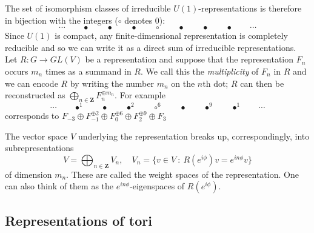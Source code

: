 \documentclass[12pt]{article}
\newcommand{\ZZ}{\mathbf{Z}}
\theoremstyle{definition}
\theoremstyle{check}
\theoremstyle{remark}
\theoremstyle{TheoremNum}
\begin{document}
The set of isomorphism classes of irreducible $U(1)$-representations is therefore in bijection with the integers ($\circ$ denotes 0):
\[
\cdots\qquad\bullet\qquad\bullet\qquad\bullet\qquad\circ\qquad\bullet\qquad\bullet\qquad\bullet\qquad\cdots
\]
Since $U(1)$ is compact, any finite-dimensional representation is completely reducible and so we can write it as a direct sum of irreducible representations. Let $R\colon G\to GL(V)$ be a representation and suppose that the representation $F_n$ occurs $m_n$ times as a summand in $R$. We call this the {\em multiplicity} of $F_n$ in $R$ and we can encode $R$ by writing the number $m_n$ on the $n$th dot; $R$ can then be reconstructed as $\bigoplus_{n\in\ZZ}F_n^{\oplus m_n}$. For example
\[
\cdots\qquad\bullet^1\qquad\bullet\qquad\bullet^2\qquad\circ^6\qquad\bullet\qquad\bullet^9\qquad\bullet^1\qquad\cdots
\]
corresponds to $F_{-3}\oplus F_{-1}^{\oplus 2}\oplus F_{0}^{\oplus 6}\oplus F_2^{\oplus 9}\oplus F_3$

The vector space $V$ underlying the representation breaks up, correspondingly, into subrepresentations
\[V=\bigoplus_{n\in\ZZ}V_n,\quad V_n=\{v\in V\ :\ R(e^{i\phi})v=e^{in\phi}v\}\]
of dimension $m_n$. These are called the weight spaces of the representation. One can also think of them as the $e^{in\phi}$-eigenspaces of $R(e^{i\phi})$.

\subsection{Representations of tori}
\end{document}
